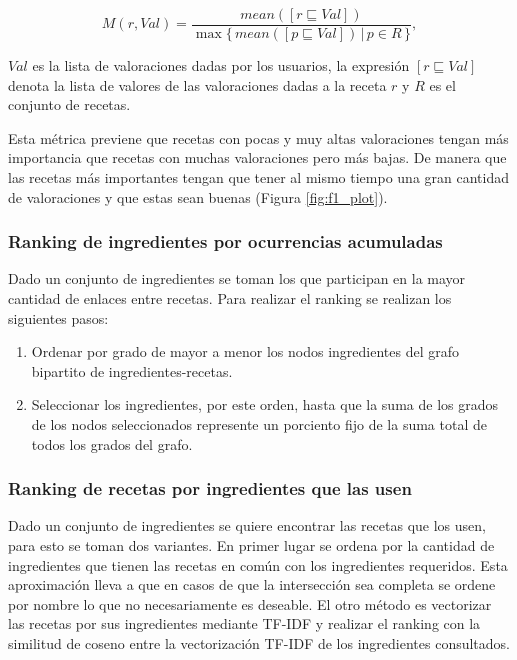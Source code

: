 \documentclass[
	a4paper, %
	10pt, %
	unnumberedsections, %
	twoside, %
]{LTJournalArticle}
\begin{document}
\begin{equation*}
	M(r, Val) = \frac{mean([r \sqsubseteq Val])}{\max \{\,mean([p \sqsubseteq Val]) \, \vert \, p \in R\,\}},
\end{equation*}

$Val$ es la lista de valoraciones dadas por los usuarios, la expresión $[r \sqsubseteq Val]$ denota la lista de valores de 
las valoraciones dadas a la receta $r$ y $R$ es el conjunto de recetas.

Esta métrica previene que recetas con pocas y muy altas valoraciones tengan más importancia que recetas con muchas
valoraciones pero más bajas. De manera que las recetas más importantes tengan que tener al mismo tiempo una gran 
cantidad de valoraciones y que estas sean buenas (Figura \ref{fig:f1_plot}). 

\subsubsection{Ranking de ingredientes por ocurrencias acumuladas}

Dado un conjunto de ingredientes se toman los que participan en la mayor cantidad de enlaces entre recetas.
Para realizar el ranking se realizan los siguientes pasos:

\begin{enumerate}
	\item Ordenar por grado de mayor a menor los nodos ingredientes del grafo bipartito de ingredientes-recetas.
	\item Seleccionar los ingredientes, por este orden, hasta que la suma de los grados de los nodos seleccionados 
	represente un porciento fijo de la suma total de todos los grados del grafo.
\end{enumerate}

\subsubsection{Ranking de recetas por ingredientes que las usen}

Dado un conjunto de ingredientes se quiere encontrar las recetas que los usen, para esto se toman dos variantes.
En primer lugar se ordena por la cantidad de ingredientes que tienen las recetas en común con los ingredientes
requeridos. Esta aproximación lleva a que en casos de que la intersección sea completa se ordene por nombre lo que
no necesariamente es deseable. El otro método es vectorizar las recetas por sus ingredientes mediante TF-IDF y
realizar el ranking con la similitud de coseno entre la vectorización TF-IDF de los ingredientes consultados.
\end{document}
